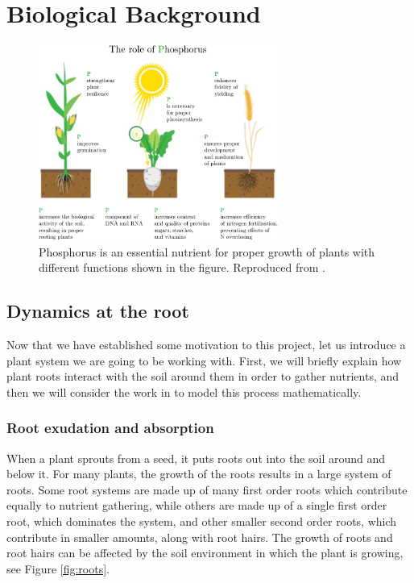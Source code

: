 \documentclass[11pt]{article}
\numberwithin{equation}{section}
\begin{document}

\section{Biological Background}
\label{sec:Bio-background}

\begin{figure}[!htb]
  \vspace{-1cm}
     \centering
     \includegraphics[width=0.7\textwidth]{Figures/PhosphorusPlantRoles.pdf}
     \caption{Phosphorus is an essential nutrient for proper growth of plants with  different functions shown in the figure. Reproduced from \cite{fertilizers}.}
     \label{fig:Phos}
 \end{figure}
 
\subsection{Dynamics at the root}
Now that we have established some motivation to this project, let us introduce a plant system we are going to be working with. First, we will briefly explain how plant roots interact with the soil around them in order to gather nutrients, and then we will consider the work in \cite{Ptashnyk-2011} to model this process mathematically.
 

\subsubsection{Root exudation and absorption}
When a plant sprouts from a seed, it puts roots out into the soil around and below it. For many plants, the growth of the roots results in a large system of roots.
Some root systems are made up of many first order roots which contribute equally to nutrient gathering, while others are made up of a single first order root, which dominates the system, and other smaller second order roots, which contribute in smaller amounts, along with root hairs. 
The growth of roots and root hairs can be affected by the soil environment in which the plant is growing, see Figure \ref{fig:roots}.
\end{document}
